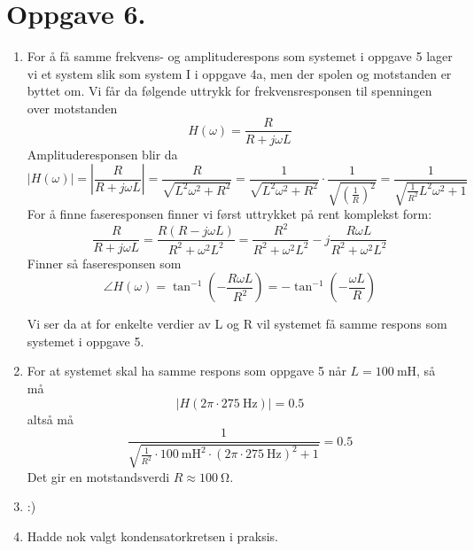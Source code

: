 \documentclass[a4paper,11pt,norsk]{article}
\begin{document}
\section*{Oppgave 6.}
\begin{enumerate}
    \item For å få samme frekvens- og amplituderespons som systemet i oppgave 5 lager vi et 
        system slik som system I i oppgave 4a, men der spolen og motstanden er byttet om.
        Vi får da følgende uttrykk for frekvensresponsen til spenningen over motstanden
        \[
            H(\omega) = \frac{R}{R + j \omega L}
        \]
        Amplituderesponsen blir da
        \[
            |H(\omega)| = \left|\frac{R}{R + j \omega L}\right| = \frac{R}{\sqrt{L^2\omega^2 + R^2}} = \frac{1}{\sqrt{L^2\omega^2 + R^2}} \cdot \frac{1}{\sqrt{\left(\frac{1}{R}\right)^2}} = \frac{1}{\sqrt{\frac{1}{R^2}L^2\omega^2 + 1}}
        \]
        For å finne faseresponsen finner vi først uttrykket på rent komplekst form:
        \[
            \frac{R}{R + j \omega L} = \frac{R(R - j \omega L)}{R^2 + \omega^2L^2} = \frac{R^2}{R^2 + \omega^2L^2} - j \frac{R \omega L}{R^2 + \omega^2L^2}
        \]
        Finner så faseresponsen som
        \[
            \angle H(\omega) = \tan^{-1}{\left(-\frac{R \omega L}{R^2}\right)} = -\tan^{-1}{\left(-\frac{\omega L}{R}\right)}
        \]

        Vi ser da at for enkelte verdier av L og R vil systemet få samme respons som systemet i oppgave 5.
    \item For at systemet skal ha samme respons som oppgave 5 når $L = \SI{100}{\milli\henry}$, så må
        \[
            |H(2\pi \cdot \SI{275}{\hertz})| = 0.5
        \]
        altså må
        \[
            \frac{1}{\sqrt{\frac{1}{R^2} \cdot \SI{100}{\milli\henry}^2 \cdot (2\pi \cdot \SI{275}{\hertz})^2 + 1}} = 0.5
        \]
        Det gir en motstandsverdi $R \approx \SI{100}{\ohm}$.
    \item :)
    \item Hadde nok valgt kondensatorkretsen i praksis.
\end{enumerate}
\end{document}

